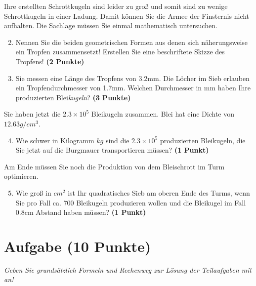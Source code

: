 \documentclass[a4paper, 9pt]{scrartcl}\usepackage[]{graphicx}\usepackage[]{xcolor}
\begin{document}
Ihre erstellten Schrottkugeln sind leider zu gro{\ss} und somit sind zu wenige
Schrottkugeln in einer Ladung. Damit k{\"o}nnen Sie die Armee der Finsternis
nicht aufhalten. Die Sachlage m{\"u}ssen Sie einmal mathematisch untersuchen.

\begin{enumerate}
  \setcounter{enumi}{1}
\item Nennen Sie die beiden geometrischen Formen aus denen sich
  n{\"a}herungsweise ein Tropfen zusammensetzt! Erstellen Sie eine beschriftete 
  Skizze des Tropfens!
  \textbf{(2 Punkte)}
\item Sie messen eine L{\"a}nge des Tropfens von 3.2mm. Die L{\"o}cher
  im Sieb erlauben ein Tropfendurchmesser von 1.7mm. Welchen
  Durchmesser in mm haben Ihre produzierten Blei\textit{kugeln}?  \textbf{(3 Punkte)}
\end{enumerate}

Sie haben jetzt die \ensuremath{2.3\times 10^{5}} Bleikugeln zusammen. Blei hat eine Dichte
von $12.63g/cm^3$.

\begin{enumerate}
  \setcounter{enumi}{3}
\item Wie schwer in Kilogramm $kg$ sind die \ensuremath{2.3\times 10^{5}} produzierten
  Bleikugeln, die Sie jetzt auf die Burgmauer transportieren m{\"u}ssen?
  \textbf{(1 Punkt)}
\end{enumerate}

Am Ende m{\"u}ssen Sie noch die Produktion von dem Bleischrott im Turm optimieren.

\begin{enumerate}
  \setcounter{enumi}{4}
\item Wie gro{\ss} in $cm^2$ ist Ihr quadratisches Sieb am oberen Ende des Turms,
  wenn Sie pro Fall ca. 700 Bleikugeln produzieren wollen und
  die Bleikugel im Fall 0.8cm Abstand haben m{\"u}ssen?  \textbf{(1
    Punkt)}
\end{enumerate}
 
\clearpage

\section{Aufgabe \hfill (10 Punkte)}

\textit{Geben Sie grunds{\"a}tzlich Formeln und Rechenweg zur L{\"o}sung der
  Teilaufgaben mit an!} \\[1Ex]
\end{document}
